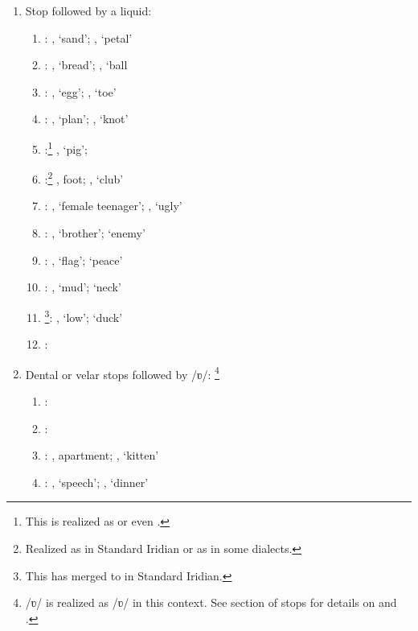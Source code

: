 \begin{enumerate}
	\item Stop followed by a liquid:
		\begin{enumerate}
			\item {}:  , `sand';  , `petal'
			\item {}:  , `bread';  , `ball
			\item {}:  , `egg';  , `toe'
			\item {}:  , `plan'; ,  `knot'
			\item {}:\footnote{This is realized as  or even \bt{\llb}.}  , `pig';  
			\item {}:\footnote{Realized as  in Standard Iridian or as  in some dialects.}  , foot;  , `club'
			\item {}:  , `female teenager';  , `ugly'
			\item {}:  , `brother';   `enemy'
			\item {}:  , `flag';   `peace'
			\item {}:  , `mud';   `neck'
			\item {}\footnote{This has merged to  in Standard Iridian.}:  , `low';   `duck'
			\item {}:  
		\end{enumerate}
	\item Dental or velar stops followed by /ʋ/: \footnote{/ʋ/ is realized as /ʋ/ in this context. See section of stops for details on  and .}
		\begin{enumerate}
			\item {}:
			\item {}:
			\item {}:  , apartment;  , `kitten'
			\item {}:  , `speech';  , `dinner'

\end{enumerate}
\end{enumerate}
